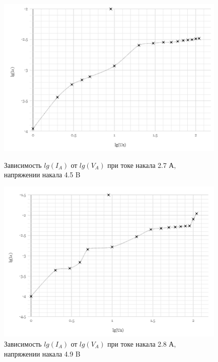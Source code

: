 \documentclass[a4paper]{article}
\begin{document}
\begin{figure}[h]
\begin{center}
\begin{minipage}[h]{0.45\linewidth}
\includegraphics[width=1\linewidth]{2_7.PNG}
\caption{Зависимость $lg(I_A)$ от $lg(V_A)$ при токе накала 2.7 А, напряжении накала 4.5 B} %
\end{minipage}
\hfill 
\begin{minipage}[h]{0.45\linewidth}
\includegraphics[width=1\linewidth]{2_8.PNG}
\caption{Зависимость $lg(I_A)$ от $lg(V_A)$ при токе накала 2.8 А, напряжении накала 4.9 B }
\label{ris:experimcoded}
\end{minipage}
\end{center}
\end{figure}
\end{document}
